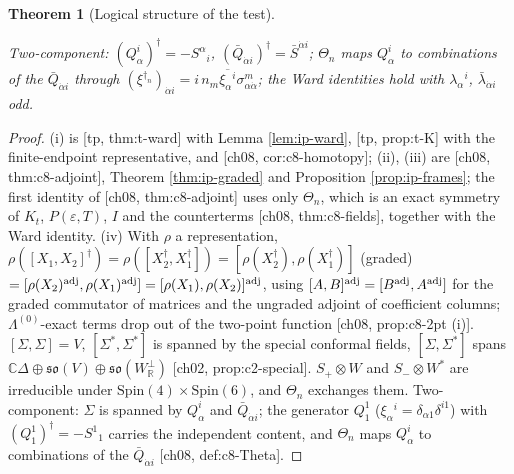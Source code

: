 \documentclass[11pt]{report}
\theoremstyle{plain}
\newtheorem{theorem}{Theorem}[chapter]
\theoremstyle{definition}
\numberwithin{equation}{chapter}
\newcommand{\Wp}{W_{\mathbb R}^\perp}
\begin{document}
\begin{theorem}[Logical structure of the test]
\begin{itemize}
\end{itemize}
Two-component: $(Q^i_\alpha)^\dagger=-S^\alpha{}_i$, $(\bar Q_{\dot\alpha i})^\dagger=\bar S^{\dot\alpha i}$; $\Theta_n$ maps $Q^i_\alpha$ to combinations of the $\bar Q_{\dot\alpha i}$ through $(\xi^{\dagger_n})_{\dot\alpha i}=i\,n_m\overline{\xi_\alpha{}^i}\sigma^m_{\alpha\dot\alpha}$; the Ward identities hold with $\lambda_\alpha{}^i$, $\bar\lambda_{\dot\alpha i}$ odd.
\end{theorem}

\begin{proof}
(i) is [tp, thm:t-ward] with Lemma \ref{lem:ip-ward}, [tp, prop:t-K] with the finite-endpoint representative, and [ch08, cor:c8-homotopy]; (ii), (iii) are [ch08, thm:c8-adjoint], Theorem \ref{thm:ip-graded} and Proposition \ref{prop:ip-frames}; the first identity of [ch08, thm:c8-adjoint] uses only $\Theta_n$, which is an exact symmetry of $K_t$, $P(\varepsilon,T)$, $I$ and the counterterms [ch08, thm:c8-fields], together with the Ward identity. (iv) With $\rho$ a representation, $\rho([X_1,X_2]^\dagger)=\rho([X_2^\dagger,X_1^\dagger])=[\rho(X_2^\dagger),\rho(X_1^\dagger)]$ (graded) $=[\rho(X_2)^{\rm adj},\rho(X_1)^{\rm adj}]=[\rho(X_1),\rho(X_2)]^{\rm adj}$, using $[A,B]^{\rm adj}=[B^{\rm adj},A^{\rm adj}]$ for the graded commutator of matrices and the ungraded adjoint of coefficient columns; $\Lambda^{(0)}$-exact terms drop out of the two-point function [ch08, prop:c8-2pt (i)]. $[\Sigma,\Sigma]=V$, $[\Sigma^*,\Sigma^*]$ is spanned by the special conformal fields, $[\Sigma,\Sigma^*]$ spans $\mathbb C\Delta\oplus\mathfrak{so}(V)\oplus\mathfrak{so}(\Wp)$ [ch02, prop:c2-special]. $S_+\otimes W$ and $S_-\otimes W^*$ are irreducible under $\mathrm{Spin}(4)\times\mathrm{Spin}(6)$, and $\Theta_n$ exchanges them. Two-component: $\Sigma$ is spanned by $Q^i_\alpha$ and $\bar Q_{\dot\alpha i}$; the generator $Q^1_1$ ($\xi_\alpha{}^i=\delta_{\alpha1}\delta^{i1}$) with $(Q^1_1)^\dagger=-S^1{}_1$ carries the independent content, and $\Theta_n$ maps $Q^i_\alpha$ to combinations of the $\bar Q_{\dot\alpha i}$ [ch08, def:c8-Theta].
\end{proof}
\end{document}
